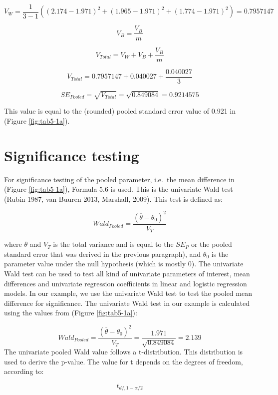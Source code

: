 \documentclass[]{book}
\theoremstyle{definition}
\theoremstyle{definition}
\theoremstyle{definition}
\theoremstyle{remark}
\begin{document}
\[V_W = \frac{1}{3-1}((2.174-1.971)^2+ (1.965-1.971)^2+(1.774-1.971)^2)=0.7957147\]

\[V_B = \frac{V_B}{m}\]

\begin{equation}
V_{Total} = V_W + V_B + \frac{V_B}{m}
  \label{eq:var-t}
\end{equation}

\[V_{Total} = 0.7957147+0.040027 + \frac{0.040027}{3}\]

\[SE_{Pooled} = \sqrt{V_{Total}} = \sqrt{0.849084} = 0.9214575\]

This value is equal to the (rounded) pooled standard error value of
0.921 in (Figure \ref{fig:tab5-1a}).

\section{Significance testing}\label{significance-testing}

For significance testing of the pooled parameter, i.e.~the mean
difference in (Figure \ref{fig:tab5-1a}), Formula 5.6 is used. This is
the univariate Wald test (Rubin 1987, van Buuren 2013, Marshall, 2009).
This test is defined as:

\begin{equation}
Wald_{Pooled} =\frac{(\overline{\theta} - {\theta_0})^2}{V_T}
  \label{eq:wald-pooled}
\end{equation}

where \(\overline{\theta}\) and \(V_T\) is the total variance and is
equal to the \(SE_P\) or the pooled standard error that was derived in
the previous paragraph), and \(\theta_0\) is the parameter value under
the null hypothesis (which is mostly 0). The univariate Wald test can be
used to test all kind of univariate parameters of interest, mean
differences and univariate regression coefficients in linear and
logistic regression models. In our example, we use the univariate Wald
test to test the pooled mean difference for significance. The univariate
Wald test in our example is calculated using the values from (Figure
\ref{fig:tab5-1a}):

\[Wald_{Pooled} =\frac{(\overline{\theta} - {\theta_0})^2}{V_T}=\frac{1.971}{\sqrt{0.849084}}=2.139\]
The univariate pooled Wald value follows a t-distribution. This
distribution is used to derive the p-value. The value for t depends on
the degrees of freedom, according to:

\begin{equation}
t_{df,1-\alpha/2}
  \label{eq:t-distr}
\end{equation}
\end{document}

